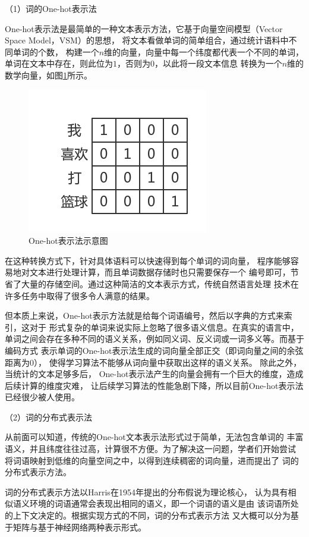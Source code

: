 （1）词的One-hot表示法

One-hot表示法是最简单的一种文本表示方法，它基于向量空间模型（Vector Space Model，VSM）的思想，
将文本看做单词的简单组合，通过统计语料中不同单词的个数，
构建一个$n$维的向量，向量中每一个纬度都代表一个不同的单词，
单词在文本中存在，则此位为$1$，否则为$0$，以此将一段文本信息
转换为一个$n$维的数学向量，如图\ref{one-hot}所示。
\begin{figure}[h]
    \includegraphics[scale=0.5]{picture/one-hot.png}
    \caption{One-hot表示法示意图}
    \label{one-hot}
\end{figure}

在这种转换方式下，针对具体语料可以快速得到每个单词的词向量，
程序能够容易地对文本进行处理计算，而且单词数据存储时也只需要保存一个
编号即可，节省了大量的存储空间。通过这种简洁的文本表示方式，传统自然语言处理
技术在许多任务中取得了很多令人满意的结果。

但本质上来说，One-hot表示方法就是给每个词语编号，然后以字典的方式来索引，这对于
形式复杂的单词来说实际上忽略了很多语义信息。在真实的语言中，
单词之间会存在多种不同的语义关系，例如同义词、反义词或一词多义等。而基于编码方式
表示单词的One-hot表示法生成的词向量全部正交（即词向量之间的余弦距离为0），
使得学习算法不能够从词向量中获取出这样的语义关系。
除此之外，当统计的文本足够多后，
One-hot表示法产生的向量会拥有一个巨大的维度，造成后续计算的维度灾难，
让后续学习算法的性能急剧下降，所以目前One-hot表示法已经很少被人使用。

（2）词的分布式表示法

从前面可以知道，传统的One-hot文本表示法形式过于简单，无法包含单词的
丰富语义，并且纬度往往过高，计算很不方便。为了解决这一问题，学者们开始尝试
将词语映射到低维的向量空间之中，以得到连续稠密的词向量，进而提出了
词的分布式表示方法。

词的分布式表示方法以Harris在1954年提出的分布假说为理论核心，
认为具有相似语义环境的词语通常会表现出相同的语义，即一个词语的语义是由
该词语所处的上下文决定的。根据实现方式的不同，词的分布式表示方法
又大概可以分为基于矩阵与基于神经网络两种表示形式。

